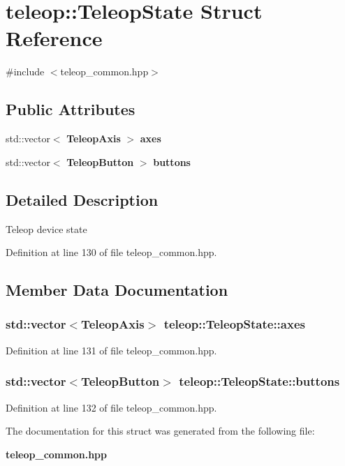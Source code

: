 \section{teleop::TeleopState Struct Reference}
\label{structteleop_1_1TeleopState}


{\ttfamily \#include $<$teleop\_\-common.hpp$>$}

\subsection*{Public Attributes}
\begin{DoxyCompactItemize}
\item 
std::vector$<$ {\bf TeleopAxis} $>$ {\bf axes}
\item 
std::vector$<$ {\bf TeleopButton} $>$ {\bf buttons}
\end{DoxyCompactItemize}


\subsection{Detailed Description}
Teleop device state 

Definition at line 130 of file teleop\_\-common.hpp.



\subsection{Member Data Documentation}
\subsubsection[{axes}]{\setlength{\rightskip}{0pt plus 5cm}std::vector$<${\bf TeleopAxis}$>$ {\bf teleop::TeleopState::axes}}\label{structteleop_1_1TeleopState_a0d5d8ad57cb592bb92087febfbe56c3f}


Definition at line 131 of file teleop\_\-common.hpp.

\subsubsection[{buttons}]{\setlength{\rightskip}{0pt plus 5cm}std::vector$<${\bf TeleopButton}$>$ {\bf teleop::TeleopState::buttons}}\label{structteleop_1_1TeleopState_a547375b52aee503d2d22d9013d3952e6}


Definition at line 132 of file teleop\_\-common.hpp.



The documentation for this struct was generated from the following file:\begin{DoxyCompactItemize}
\item 
{\bf teleop\_\-common.hpp}\end{DoxyCompactItemize}
